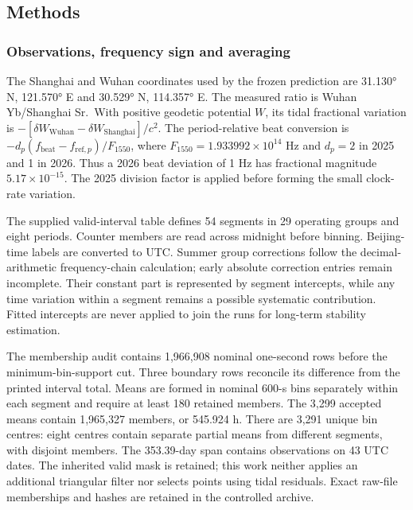 \documentclass[
  12pt,
  a4paper,
]{article}
\begin{document}
\hypertarget{methods}{%
\subsection{Methods}\label{methods}}

\hypertarget{observations-frequency-sign-and-averaging}{%
\subsubsection{Observations, frequency sign and
averaging}\label{observations-frequency-sign-and-averaging}}

The Shanghai and Wuhan coordinates used by the frozen prediction are
31.130° N, 121.570° E and 30.529° N, 114.357° E. The measured ratio is
Wuhan Yb/Shanghai Sr.~With positive geodetic potential \(W\), its tidal
fractional variation is
\(-[\delta W_{\mathrm{Wuhan}}-\delta W_{\mathrm{Shanghai}}]/c^2\). The
period-relative beat conversion is
\(-d_p(f_{\mathrm{beat}}-f_{{\mathrm{ref}},p})/F_{1550}\), where
\(F_{1550}=1.933992\times10^{14}\) Hz and \(d_p=2\) in 2025 and 1 in
2026. Thus a 2026 beat deviation of 1 Hz has fractional magnitude
\(5.17\times10^{-15}\). The 2025 division factor is applied before
forming the small clock-rate variation.

The supplied valid-interval table defines 54 segments in 29 operating
groups and eight periods. Counter members are read across midnight
before binning. Beijing-time labels are converted to UTC. Summer group
corrections follow the decimal-arithmetic frequency-chain calculation;
early absolute correction entries remain incomplete. Their constant part
is represented by segment intercepts, while any time variation within a
segment remains a possible systematic contribution. Fitted intercepts
are never applied to join the runs for long-term stability estimation.

The membership audit contains 1,966,908 nominal one-second rows before
the minimum-bin-support cut. Three boundary rows reconcile its
difference from the printed interval total. Means are formed in nominal
600-s bins separately within each segment and require at least 180
retained members. The 3,299 accepted means contain 1,965,327 members, or
545.924 h. There are 3,291 unique bin centres: eight centres contain
separate partial means from different segments, with disjoint members.
The 353.39-day span contains observations on 43 UTC dates. The inherited
valid mask is retained; this work neither applies an additional
triangular filter nor selects points using tidal residuals. Exact
raw-file memberships and hashes are retained in the controlled archive.
\end{document}
